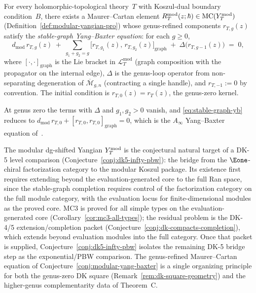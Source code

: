 \begin{conjecture}
\label{conj:modular-yang-baxter}
For every holomorphic-topological theory~$T$ with Koszul-dual
boundary condition~$B$, there exists a Maurer--Cartan element
$R_T^{\mathrm{mod}}(z;\hbar) \in \operatorname{MC}(Y^{\mathrm{mod}}_T)$
(Definition~\ref{def:modular-yangian-pro}) whose genus-refined
components $r_{T,g}(z)$ satisfy the \emph{stable-graph
Yang--Baxter equation}: for each $g \ge 0$,
\begin{equation}\label{eq:stable-graph-yb}
 d_{\mathrm{mod}}\, r_{T,g}(z)
 \;+\;
 \sum_{g_1+g_2=g}
 \bigl[r_{T,g_1}(z),\, r_{T,g_2}(z)\bigr]_{\mathrm{graph}}
 \;+\;
 \Delta\bigl(r_{T,g-1}(z)\bigr)
 \;=\; 0,
\end{equation}
where $[\cdot,\cdot]_{\mathrm{graph}}$ is the Lie bracket in
$\mathcal{L}_T^{\mathrm{mod}}$ (graph composition with the
propagator on the internal edge), $\Delta$ is the genus-loop
operator from non-separating degeneration of
$\overline{\mathcal{M}}_{g,n}$ (contracting a single handle),
and $r_{T,-1} := 0$ by convention. The initial condition is
$r_{T,0}(z) = r_T(z)$, the genus-zero kernel.

At genus zero the
terms with $\Delta$ and $g_1,g_2 > 0$ vanish, and
\eqref{eq:stable-graph-yb} reduces to
$d_{\mathrm{mod}}\,r_{T,0} + [r_{T,0},r_{T,0}]_{\mathrm{graph}} = 0$,
which is the $A_\infty$ Yang--Baxter equation
of~\cite{DNP25}.
\end{conjecture}

\begin{remark}
\label{rem:modular-yangian-dk}
The modular dg-shifted Yangian $Y^{\mathrm{mod}}_T$ is the conjectural natural
target of a DK-5 level comparison
(Conjecture~\ref{conj:dk5-infty-pbw}): the bridge from the
$\Eone$-chiral factorization category to the modular Koszul
package. Its existence first requires extending beyond the evaluation-generated
core to the full Ran space, since the
stable-graph completion requires control of the factorization
category on the full module category, with the evaluation locus for
finite-dimensional modules as the proved core. MC3 is proved for all simple
types on the evaluation-generated core
\textup{(}Corollary~\ref{cor:mc3-all-types}\textup{)}; the residual
problem is the DK-4/5 extension/completion packet
\textup{(}Conjecture~\ref{conj:dk-compacts-completion}\textup{)},
which extends beyond evaluation modules into the full category.
Once that packet is supplied, Conjecture~\ref{conj:dk5-infty-pbw}
isolates the remaining DK-5 bridge step as the
exponential/PBW comparison. The genus-refined Maurer--Cartan
equation of Conjecture~\ref{conj:modular-yang-baxter} is a
single organizing principle for both the genus-zero DK square
(Remark~\ref{rem:dk-square-geometry}) and the higher-genus
complementarity data of Theorem~C.
\end{remark}

